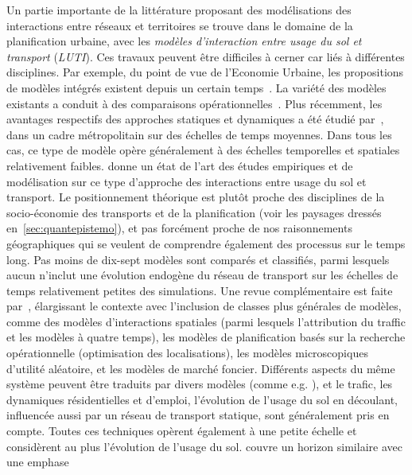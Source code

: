 {Un partie importante de la littérature proposant des modélisations des interactions entre réseaux et territoires se trouve dans le domaine de la planification urbaine, avec les \emph{modèles d'interaction entre usage du sol et transport} (\emph{LUTI}). Ces travaux peuvent être difficiles à cerner car liés à différentes disciplines. Par exemple, du point de vue de l'Economie Urbaine, les propositions de modèles intégrés existent depuis un certain temps~\cite{putman1975urban}. La variété des modèles existants a conduit à des comparaisons opérationnelles~\cite{paulley1991overview}. Plus récemment, les avantages respectifs des approches statiques et dynamiques a été étudié par~\cite{kryvobokov2013comparison}, dans un cadre métropolitain sur des échelles de temps moyennes. Dans tous les cas, ce type de modèle opère généralement à des échelles temporelles et spatiales relativement faibles. \cite{wegener2004land} donne un état de l'art des études empiriques et de modélisation sur ce type d'approche des interactions entre usage du sol et transport. Le positionnement théorique est plutôt proche des disciplines de la socio-économie des transports et de la planification (voir les paysages dressés en~\ref{sec:quantepistemo}), et pas forcément proche de nos raisonnements géographiques qui se veulent de comprendre également des processus sur le temps long. Pas moins de dix-sept modèles sont comparés et classifiés, parmi lesquels aucun n'inclut une évolution endogène du réseau de transport sur les échelles de temps relativement petites des simulations. Une revue complémentaire est faite par~\cite{chang2006models}, élargissant le contexte avec l'inclusion de classes plus générales de modèles, comme des modèles d'interactions spatiales (parmi lesquels l'attribution du traffic et les modèles à quatre temps), les modèles de planification basés sur la recherche opérationnelle (optimisation des localisations), les modèles microscopiques d'utilité aléatoire, et les modèles de marché foncier. Différents aspects du même système peuvent être traduits par divers modèles (comme e.g. \cite{wegener1991one}), et le trafic, les dynamiques résidentielles et d'emploi, l'évolution de l'usage du sol en découlant, influencée aussi par un réseau de transport statique, sont généralement pris en compte. Toutes ces techniques opèrent également à une petite échelle et considèrent au plus l'évolution de l'usage du sol. \cite{iacono2008models} couvre un horizon similaire avec une emphase }
